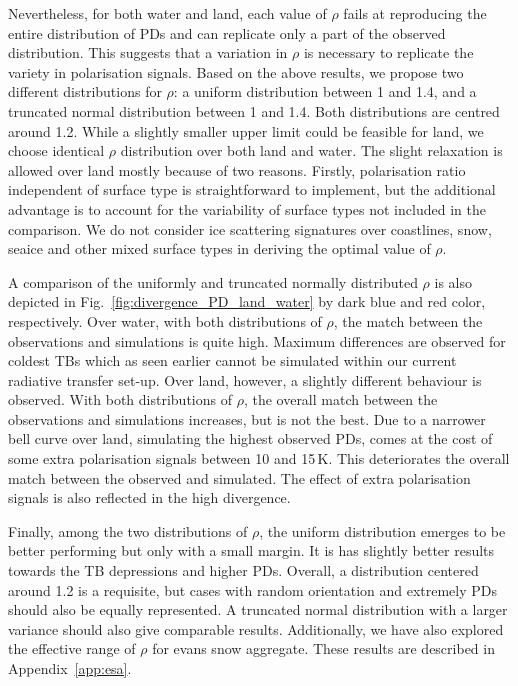 \documentclass[amt, manuscript]{copernicus}
\begin{document}
Nevertheless, for both water and land, each value of $\rho$ fails at reproducing the entire distribution of PDs and can replicate only a part of the observed distribution. This suggests that a variation in $\rho$ is necessary to replicate the variety in polarisation signals. Based on the above results, we propose two different distributions for $\rho$: a uniform distribution between 1 and 1.4, and a truncated normal distribution between 1 and 1.4. Both distributions are centred around 1.2. While a slightly smaller upper limit could be feasible for land, we choose identical $\rho$ distribution over both land and water. The slight relaxation is allowed over land mostly because of two reasons. Firstly, polarisation ratio independent of surface type is straightforward to implement, but the additional advantage is to account for the variability of surface types not included in the comparison. We do not consider ice scattering signatures over coastlines, snow, seaice and other mixed surface types in deriving the optimal value of $\rho$. 

A comparison of the uniformly and truncated normally distributed $\rho$ is also depicted in Fig.~\ref{fig:divergence_PD_land_water} by dark blue and red color, respectively. Over water, with both distributions of $\rho$, the match between the observations and simulations is quite high. Maximum differences are observed for coldest TBs which as seen earlier cannot be simulated within our current radiative transfer set-up. Over land, however, a slightly different behaviour is observed. With both distributions of $\rho$, the overall match between the observations and simulations increases, but is not the best. Due to a narrower bell curve over land, simulating the highest observed PDs, comes at the cost of some extra polarisation signals between 10 and 15\,K. This deteriorates the overall match between the observed and simulated. The effect of extra polarisation signals is also reflected in the high divergence. 

Finally, among the two distributions of $\rho$, the uniform distribution emerges to be better performing but only with a small margin. It is has slightly better results towards the TB depressions and higher PDs. Overall, a distribution centered around 1.2 is a requisite, but cases with random orientation and extremely PDs should also be equally represented. A truncated normal distribution with a larger variance should also give comparable results. Additionally, we have also explored the effective range of $\rho$ for evans snow aggregate. These results are described in Appendix~\ref{app:esa}. 
\end{document}

